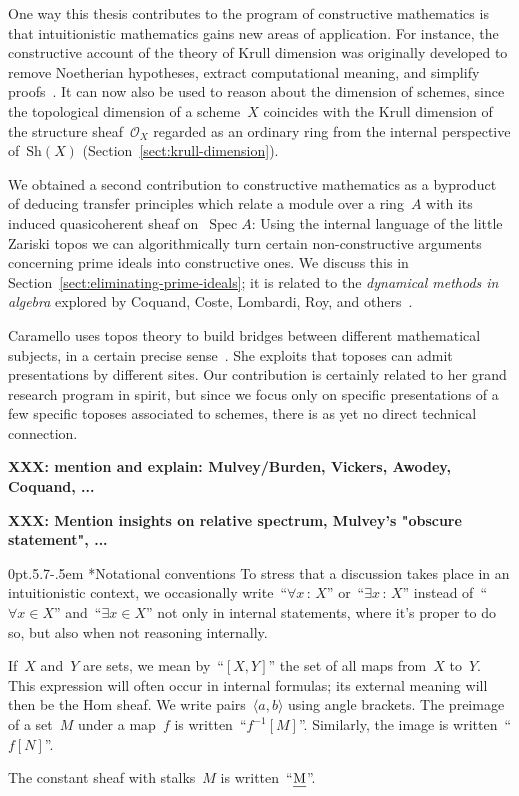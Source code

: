 \documentclass[10pt,reqno,a4paper]{amsbook}
\makeatletter
\theoremstyle{definition}
\theoremstyle{plain}
\theoremstyle{remark}
\renewcommand{\O}{\mathcal{O}}
\let\oldul\ul
\renewcommand{\ul}[1]{\text{\oldul{$#1$}}}
\newcommand{\Sh}{\mathrm{Sh}}
\DeclareMathOperator{\Spec}{Spec}
\newcommand{\?}{\,{:}\,}
\renewcommand{\_}{\mathpunct{.}\,}
\newcommand{\XXX}[1]{\textbf{XXX: #1}}
\def\subsection{\@startsection{subsection}{2}%
  {0pt}{.5\linespacing\@plus.7\linespacing}{-.5em}%
  {\normalfont\bfseries}}
\makeatother
\begin{document}
{One way this thesis contributes to the program of constructive
mathematics is that intuitionistic mathematics gains new areas of application.
For instance, the constructive account of the theory of Krull dimension was
originally developed to remove Noetherian hypotheses, extract computational meaning, and
simplify proofs~\cite{dyn:krull-integral,dyn:char-krull}. It can now also be used to
reason about the dimension of schemes, since the topological dimension of a
scheme~$X$ coincides with the Krull dimension of the structure sheaf~$\O_X$
regarded as an ordinary ring from the internal perspective of~$\Sh(X)$
(Section~\ref{sect:krull-dimension}).

We obtained a second contribution to constructive mathematics as a byproduct of
deducing transfer principles which relate a module over a ring~$A$ with its
induced quasicoherent sheaf on~$\Spec A$: Using the internal language of the
little Zariski topos we can algorithmically turn certain non-constructive
arguments concerning prime ideals into constructive ones. We discuss this in
Section~\ref{sect:eliminating-prime-ideals}; it is related to the
\emph{dynamical methods in algebra} explored by Coquand, Coste, Lombardi, Roy,
and others~\cite{clr:dynamicalmethod,cl:logical}.

Caramello uses topos theory to build bridges between different mathematical
subjects, in a certain precise sense~\cite{caramello:1,caramello:2}. She
exploits that toposes can admit presentations by different sites. Our
contribution is certainly related to her grand research program in spirit, but since we
focus only on specific presentations of a few specific toposes associated to
schemes, there is as yet no direct technical connection.

\XXX{mention and explain: Mulvey/Burden, Vickers, Awodey, Coquand, ...}

\XXX{Mention insights on relative spectrum, Mulvey's "obscure statement", ...}


\subsection*{Notational conventions} To stress that a discussion takes place in
an intuitionistic context, we occasionally write~``$\forall x\?X$''
or~``$\exists x\?X$'' instead of~``$\forall x \in X$'' and~``$\exists x \in
X$'' not only in internal statements, where it's proper to do so, but also when
not reasoning internally.

If~$X$ and~$Y$ are sets, we mean by~``$[X,Y]$'' the set of all maps from~$X$
to~$Y$. This expression will often occur in internal formulas; its external
meaning will then be the Hom sheaf. We write pairs~$\langle a, b \rangle$ using
angle brackets. The preimage of a set~$M$ under a map~$f$ is
written~``$f^{-1}[M]$''. Similarly, the image is written~``$f[N]$''.

The constant sheaf with stalks~$M$ is written~``$\ul{M}$''.

}
\end{document}
